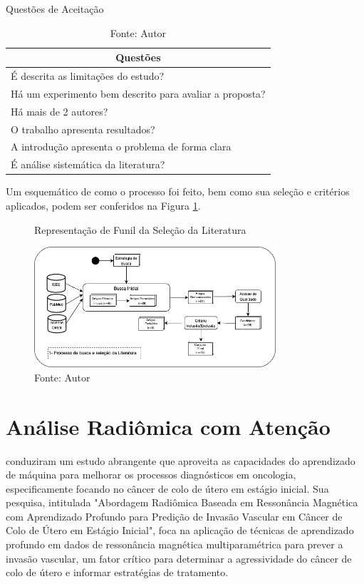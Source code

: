 \begin{table}[hbtp]
    \centering
    \caption{Questões de Aceitação}
    \renewcommand{\arraystretch}{1.4} %
    \begin{tabular}{|l|}
    \hline 
          \multicolumn{1}{|c|}{\textbf{Questões}} \\ 
    \hline 
        \quad É descrita as limitações do estudo? \\
        \quad Há um experimento bem descrito para avaliar a proposta? \\
        \quad Há mais de 2 autores? \\
        \quad O trabalho apresenta resultados? \\
        \quad A introdução apresenta o problema de forma clara \\
        \quad É análise sistemática da literatura? \\
    \hline 
    \end{tabular} 
    \caption*{Fonte: Autor}
    \label{tab:questoes}
\end{table}

Um esquemático de como o processo foi feito, bem como sua seleção e critérios aplicados, podem ser conferidos na Figura \ref{fig:fig021}.

\begin{figure}[htbp]
    \centering
    \caption{Representação de Funil da Seleção da Literatura}
    \includegraphics[width=0.8\textwidth]{figures/fig021.png}
    \caption*{Fonte: Autor}
    \label{fig:fig021}
\end{figure}
\section{Análise Radiômica com Atenção}
\label{sec:analise_radiomica}

 \citeauthor{jiangMRIBasedRadiomics2021} \citeyear{jiangMRIBasedRadiomics2021} conduziram um estudo abrangente que aproveita as capacidades do aprendizado de máquina para melhorar os processos diagnósticos em oncologia, especificamente focando no câncer de colo de útero em estágio inicial. Sua pesquisa, intitulada "Abordagem Radiômica Baseada em Ressonância Magnética com Aprendizado Profundo para Predição de Invasão Vascular em Câncer de Colo de Útero em Estágio Inicial", foca na aplicação de técnicas de aprendizado profundo em dados de ressonância magnética multiparamétrica para prever a invasão vascular, um fator crítico para determinar a agressividade do câncer de colo de útero e informar estratégias de tratamento.


